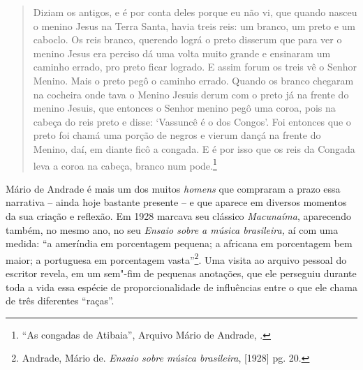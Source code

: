 \begin{quote}
Diziam os antigos, e é por conta deles porque eu não vi, que quando
nasceu o menino Jesus na Terra Santa, havia treis reis: um branco, um
preto e um caboclo. Os reis branco, querendo lográ o preto disserum que
para ver o menino Jesus era perciso dá uma volta muito grande e
ensinaram um caminho errado, pro preto ficar logrado. E assim forum os
treis vê o Senhor Menino. Mais o preto pegô o caminho errado. Quando os
branco chegaram na cocheira onde tava o Menino Jesuis derum com o preto
já na frente do menino Jesuis, que entonces o Senhor menino pegô uma
coroa, pois na cabeça do reis preto e disse: `Vassuncê é o dos Congos'.
Foi entonces que o preto foi chamá uma porção de negros e vierum dançá
na frente do Menino, daí, em diante ficô a congada. E é por isso que os
reis da Congada leva a coroa na cabeça, branco num pode.\footnote{``As
  congadas de Atibaia'', Arquivo Mário de Andrade, .}
\end{quote}

Mário de Andrade é mais um dos muitos \emph{homens} que compraram a
prazo essa narrativa -- ainda hoje bastante presente -- e que aparece em
diversos momentos da sua criação e reflexão. Em 1928 marcava seu
clássico \emph{Macunaíma}, aparecendo também, no mesmo ano, no seu
\emph{Ensaio sobre a música brasileira,} aí com uma medida: ``a
ameríndia em porcentagem pequena; a africana em porcentagem bem maior; a
portuguesa em porcentagem vasta''\footnote{Andrade, Mário de.
  \emph{Ensaio sobre música brasileira}, {[}1928{]} pg. 20.}. Uma visita
ao arquivo pessoal do escritor revela, em um sem"-fim de pequenas
anotações, que ele perseguiu durante toda a vida essa espécie de
proporcionalidade de influências entre o que ele chama de três
diferentes ``raças''.

